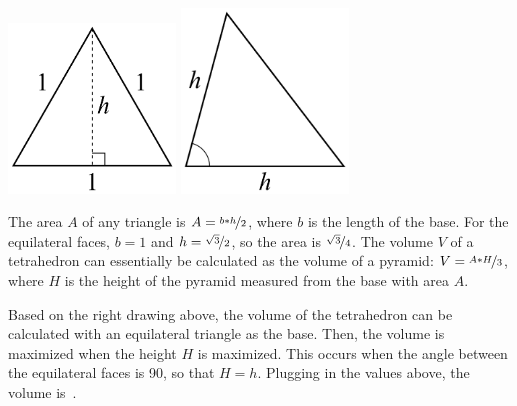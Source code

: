 \documentclass{article}
\begin{document}
\vspace{0.1in}
\begin{center}
\includegraphics[width=1.75in]{triangle_1.png}
\hspace{1.25in}
\includegraphics[width=1.75in]{triangle_2.png}
\end{center}
\vspace{0.1in}

The area $A$ of any triangle is $A=\nicefrac{b*h}{2}$, where $b$ is the length of the base.
For the equilateral faces, $b=1$ and $h=\nicefrac{\sqrt{3}}{2}$, so the area is $\nicefrac{\sqrt{3}}{4}$.
The volume $V$ of a tetrahedron can essentially be calculated as the volume of a pyramid: $V=\nicefrac{A*H}{3}$, where $H$ is the height of the pyramid measured from the base with area $A$.

Based on the right drawing above, the volume of the tetrahedron can be calculated with an equilateral triangle as the base.
Then, the volume is maximized when the height $H$ is maximized.
This occurs when the angle between the equilateral faces is 90\textdegree, so that $H=h$.
Plugging in the values above, the volume is
\,.
\end{document}
